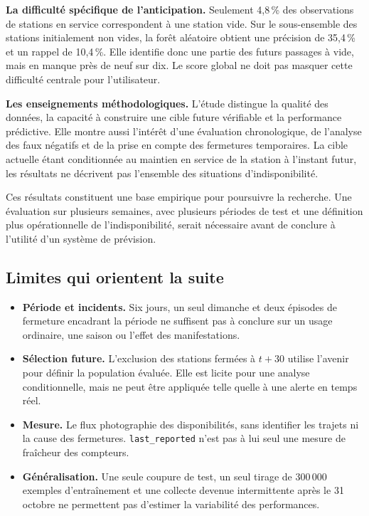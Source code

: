 \documentclass[11pt,a4paper]{article}
\begin{document}
\textbf{La difficulté spécifique de l'anticipation.}
Seulement 4,8\,\% des observations de stations en service correspondent à une station vide. Sur le sous-ensemble des stations initialement non vides, la forêt aléatoire obtient une précision de 35,4\,\% et un rappel de 10,4\,\%. Elle identifie donc une partie des futurs passages à vide, mais en manque près de neuf sur dix. Le score global ne doit pas masquer cette difficulté centrale pour l'utilisateur.

\textbf{Les enseignements méthodologiques.}
L'étude distingue la qualité des données, la capacité à construire une cible future vérifiable et la performance prédictive. Elle montre aussi l'intérêt d'une évaluation chronologique, de l'analyse des faux négatifs et de la prise en compte des fermetures temporaires. La cible actuelle étant conditionnée au maintien en service de la station à l'instant futur, les résultats ne décrivent pas l'ensemble des situations d'indisponibilité.

Ces résultats constituent une base empirique pour poursuivre la recherche. Une évaluation sur plusieurs semaines, avec plusieurs périodes de test et une définition plus opérationnelle de l'indisponibilité, serait nécessaire avant de conclure à l'utilité d'un système de prévision.

\subsection{Limites qui orientent la suite}
\begin{itemize}
\item \textbf{Période et incidents.} Six jours, un seul dimanche et deux épisodes de fermeture encadrant la période ne suffisent pas à conclure sur un usage ordinaire, une saison ou l'effet des manifestations.
\item \textbf{Sélection future.} L'exclusion des stations fermées à $t+30$ utilise l'avenir pour définir la population évaluée. Elle est licite pour une analyse conditionnelle, mais ne peut être appliquée telle quelle à une alerte en temps réel.
\item \textbf{Mesure.} Le flux photographie des disponibilités, sans identifier les trajets ni la cause des fermetures. \texttt{last\_reported} n'est pas à lui seul une mesure de fraîcheur des compteurs.
\item \textbf{Généralisation.} Une seule coupure de test, un seul tirage de 300\,000 exemples d'entraînement et une collecte devenue intermittente après le 31 octobre ne permettent pas d'estimer la variabilité des performances.
\end{itemize}
\end{document}
